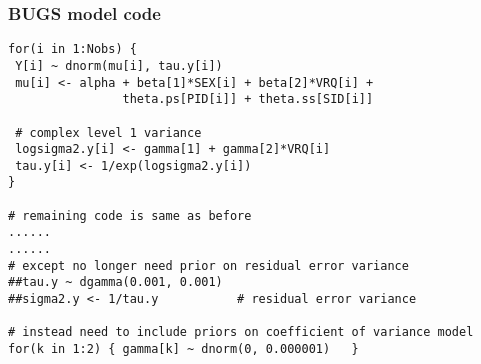 \documentclass[handout]{beamer}
\begin{document}
\begin{frame}[fragile]

\frametitle{BUGS model code}
\begin{small}\begin{verbatim}
for(i in 1:Nobs) {
 Y[i] ~ dnorm(mu[i], tau.y[i])
 mu[i] <- alpha + beta[1]*SEX[i] + beta[2]*VRQ[i] +
                theta.ps[PID[i]] + theta.ss[SID[i]]

 # complex level 1 variance
 logsigma2.y[i] <- gamma[1] + gamma[2]*VRQ[i]
 tau.y[i] <- 1/exp(logsigma2.y[i])
}

# remaining code is same as before
......
......
# except no longer need prior on residual error variance
##tau.y ~ dgamma(0.001, 0.001)
##sigma2.y <- 1/tau.y           # residual error variance

# instead need to include priors on coefficient of variance model
for(k in 1:2) { gamma[k] ~ dnorm(0, 0.000001)   }

\end{verbatim}\end{small}
\end{frame}
\end{document}
